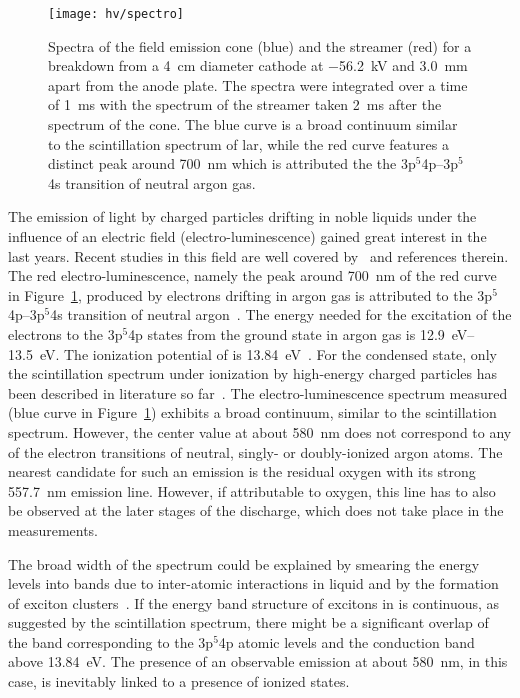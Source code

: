 \begin{figure}[htb]
	\centering
	\texttt{[image: hv/spectro]}
	\caption[ test field emission and streamer spectra]{
		Spectra of the field emission cone (blue) and the streamer (red) for a breakdown from a \SI{4}{\centi\metre} diameter cathode at \SI{-56.2}{\kilo\volt} and \SI{3.0}{\milli\metre} apart from the anode plate.
		The spectra were integrated over a time of \SI{1}{\milli\second} with the spectrum of the streamer taken \SI{2}{\milli\second} after the spectrum of the cone.
		The blue curve is a broad continuum similar to the scintillation spectrum of \acrshort{lar}, while the red curve features a distinct peak around \SI{700}{\nano\metre} which is attributed the the 3p$^5$4p--3p$^5$4s transition of neutral argon gas.
	}
	\label{fig:hv_spectro}
\end{figure}

The emission of light by charged particles drifting in noble liquids under the influence of an electric field (electro-luminescence) gained great interest in the last years.
Recent studies in this field are well covered by~\cite{buzulutskov1, buzulutskov2, buzulutskov3} and references therein.
The red electro-luminescence, namely the peak around \SI{700}{\nano\metre} of the red curve in Figure~\ref{fig:hv_spectro}, produced by electrons drifting in argon gas is attributed to the 3p$^5$4p--3p$^5$4s transition of neutral argon~\cite{Boffard}.
The energy needed for the excitation of the electrons to the 3p$^5$4p states from the ground state in argon gas is \SIrange{12.9}{13.5}{\electronvolt}.
The ionization potential of \lar{} is \SI{13.84}{\electronvolt}~\cite{2photonAbs}.
For the condensed state, only the scintillation spectrum under ionization by high-energy charged particles has been described in literature so far~\cite{Heindl}.
The electro-luminescence spectrum measured (blue curve in Figure~\ref{fig:hv_spectro}) exhibits a broad continuum, similar to the scintillation spectrum.
However, the center value at about \SI{580}{\nano\metre} does not correspond to any of the electron transitions of neutral, singly- or doubly-ionized argon atoms.
The nearest candidate for such an emission is the residual oxygen with its strong \SI{557.7}{\nano\metre} emission line.
However, if attributable to oxygen, this line has to also be observed at the later stages of the discharge, which does not take place in the measurements.

The broad width of the spectrum could be explained by smearing the energy levels into bands due to inter-atomic interactions in liquid and by the formation of exciton clusters~\cite{Bernstorff, Foerstel}.
If the energy band structure of excitons in \lar{} is continuous, as suggested by the scintillation spectrum, there might be a significant overlap of the band corresponding to the 3p$^5$4p atomic levels and the conduction band above \SI{13.84}{\electronvolt}.
The presence of an observable emission at about \SI{580}{\nano\metre}, in this case, is inevitably linked to a presence of ionized states.


